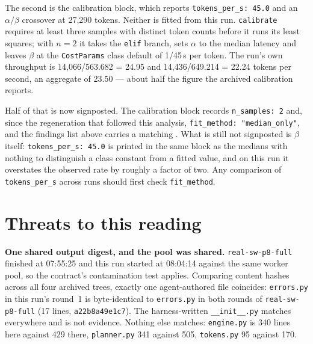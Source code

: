 \documentclass[11pt]{article}
\begin{document}
The second is the calibration block, which reports \texttt{tokens\_per\_s: 45.0} and an
$\alpha/\beta$ crossover at 27{,}290 tokens. Neither is fitted from this run.
\texttt{calibrate} requires at least three samples with distinct token counts before it runs
its least squares; with $n = 2$ it takes the \texttt{elif} branch, sets $\alpha$ to the median
latency and leaves $\beta$ at the \texttt{CostParams} class default of 1/45\,s per token. The
run's own throughput is 14{,}066/563.682 = 24.95 and 14{,}436/649.214 = 22.24 tokens per
second, an aggregate of 23.50 --- about half the figure the archived calibration reports.

Half of that is now signposted. The calibration block records \texttt{n\_samples: 2} and, since
the regeneration that followed this analysis, \texttt{fit\_method: "median\_only"}, and the
findings list above carries a matching . What is still not signposted is
$\beta$ itself: \texttt{tokens\_per\_s: 45.0} is printed in the same block as the medians with
nothing to distinguish a class constant from a fitted value, and on this run it overstates the
observed rate by roughly a factor of two. Any comparison of \texttt{tokens\_per\_s} across
runs should first check \texttt{fit\_method}.

\section{Threats to this reading}

\textbf{One shared output digest, and the pool was shared.} \texttt{real-sw-p8-full} finished
at 07:55:25 and this run started at 08:04:14 against the same worker pool, so the contract's
contamination test applies. Comparing content hashes across all four archived trees, exactly
one agent-authored file coincides: \texttt{errors.py} in this run's round~1 is byte-identical
to \texttt{errors.py} in both rounds of \texttt{real-sw-p8-full} (17 lines,
\texttt{a22b8a49e1c7}). The harness-written \texttt{\_\_init\_\_.py} matches everywhere and is
not evidence. Nothing else matches: \texttt{engine.py} is 340 lines here against 429 there,
\texttt{planner.py} 341 against 505, \texttt{tokens.py} 95 against 170.
\end{document}
